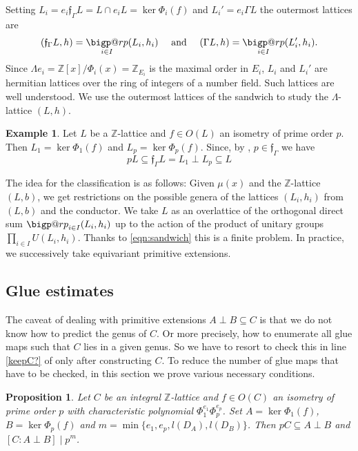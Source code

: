 \documentclass[a4paper]{amsart}
\makeatletter
\theoremstyle{definition}
\newtheorem{example}[definition]{Example}
\theoremstyle{plain}
\newtheorem{proposition}[definition]{Proposition}
\newcommand{\ZZ}{\mathbb{Z}}
\newcommand{\bigperp}{%
  \mathop{\mathpalette\bigp@rp\relax}%
  \displaylimits
}
\newcommand{\bigp@rp}[2]{%
  \vcenter{
    \m@th\hbox{\scalebox{\ifx#1\displaystyle2.1\else1.5\fi}{$#1\perp$}}
  }%
}
\makeatother
\begin{document}
Setting $L_i = e_i \mathfrak{f}_{\Gamma}  L = L \cap e_i L = \ker \Phi_i(f)$ and $L_i' = e_i  \Gamma L$ the outermost lattices are
\[(\mathfrak{f}_{\Gamma}L,h) =\bigperp_{i\in I}(L_i,h_i)\quad \text{ and } \quad
(\Gamma L,h) = \bigperp_{i\in I} (L_i',h_i).\]
Since $\Lambda e_i=\ZZ[x]/\Phi_i(x) = \ZZ_{E_i}$ is the maximal order in $E_i$, $L_i$ and $L_i'$ are hermitian lattices over the
ring of integers of a number field. Such lattices are well understood.
We use the outermost lattices of the sandwich to study the $\Lambda$-lattice $(L,h)$.
\begin{example}\label{ex:porder}
 Let $L$ be a $\ZZ$-lattice and $f\in O(L)$ an isometry of prime order $p$.
 Then $L_1 = \ker \Phi_1(f)$ and $L_p = \ker \Phi_p(f)$. Since, by , $p \in \mathfrak{f}_\Gamma$ we have
 \begin{equation}\label{index-p}
p L \subseteq \mathfrak{f}_\Gamma L= L_1 \perp L_p \subseteq L
 \end{equation}
\end{example}

%

%
%
%
%
%
%
%
%
%
%
The idea for the classification is as follows:
Given $\mu(x)$ and the $\ZZ$-lattice
$(L,b)$,
we get restrictions on the possible genera of the lattices
$(L_i,h_i)$ from $(L,b)$ and the conductor.
We take $L$ as an overlattice of the orthogonal direct sum $\bigperp_{i\in I} (L_i,h_i)$
up to the action of the product of unitary groups $\prod_{i \in I}U(L_i,h_i)$.
Thanks to \cref{eqn:sandwich}
this is a finite problem. In practice, we successively take equivariant primitive extensions.

\subsection{Glue estimates}\label{glue_estim}
The caveat of dealing with primitive extensions $A \perp B \subseteq C$ is that we do not know how to predict the genus of $C$.
Or more precisely, how to enumerate all glue maps such that $C$ lies in a given genus.
So we have to resort to check this in line \ref{keepC?} of  only after constructing $C$.
To reduce the number of glue maps that have to be checked, in this section we prove various necessary conditions.

%
%
%
%
%
%
%
%
%
%
%
%
%
%
%
%
%
%
%
%
%
%
%
%
%
%
%
%
%
%
%
%
%
%
%
%

%
%
%
%
%
%
%
%

\begin{proposition}\label{glue:det-estimate}
Let $C$ be an integral $\ZZ$-lattice and $f \in O(C)$ an isometry of prime order $p$ with characteristic polynomial
$\Phi_1^{e_1}\Phi_p^{e_p}$.
Set $A= \ker \Phi_1(f)$, $B = \ker \Phi_p(f)$ and $m = \min\{e_1,e_p,l(D_A),l(D_B)\}$.
Then $pC \subseteq A \perp B$ and $[C: A\perp B] \mid p^m$.
\end{proposition}
\end{document}
